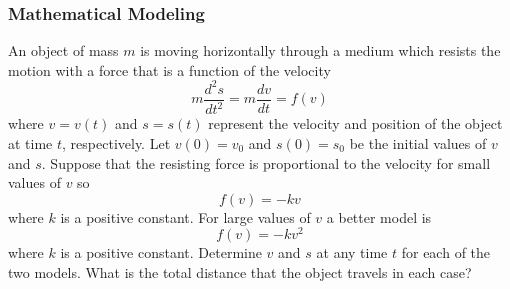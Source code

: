 \subsubsection{Mathematical Modeling}
\begin{problem}
    An object of mass \(m\) is moving horizontally through a medium which resists the
    motion with a force that is a function of the velocity
    \[m\frac{d^2s}{dt^2}=m\frac{dv}{dt}=f(v)\]
    where \(v=v(t)\) and \(s=s(t)\) represent the velocity and position of the
    object at time \(t\), respectively.
    Let \(v(0)=v_0\) and \(s(0)=s_0\) be the initial values of \(v\) and \(s\).
    Suppose that the resisting force is proportional to the velocity for small
    values of \(v\) so
    \[f(v)=-kv\]
    where \(k\) is a positive constant.
    For large values of \(v\) a better model is
    \[f(v)=-kv^2\]
    where \(k\) is a positive constant.
    Determine \(v\) and \(s\) at any time \(t\) for each of the two models.
    What is the total distance that the object travels in each case?
\end{problem}
